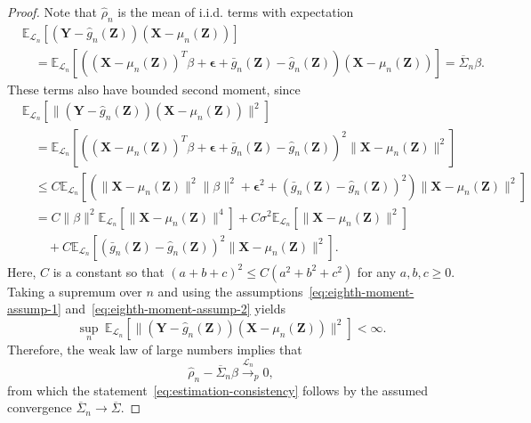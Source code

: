 \documentclass[12pt]{article}
\theoremstyle{definition}
\theoremstyle{remark}
\newcommand{\prx}{\bm X}
\newcommand{\prz}{\bm Z}
\newcommand{\pry}{{\bm Y}}
\newcommand{\peps}{\bm \epsilon}
\begin{document}
\begin{proof}

Note that $\widehat \rho_n$ is the mean of i.i.d. terms with expectation 
\begin{equation}
	\begin{split}
		&\mathbb E_{\mathcal L_n}[(\pry - \widehat g_n(\prz))(\prx - \mu_n(\prz))]  \\
		&\quad = \mathbb E_{\mathcal L_n}[((\prx - \mu_n(\prz))^T\beta + \peps + \bar g_n(\prz) - \widehat g_n(\prz))(\prx - \mu_n(\prz))] = \overline \Sigma_n \beta.
	\end{split}
\end{equation}
These terms also have bounded second moment, since
\begin{equation}
	\begin{split}
		&\mathbb E_{\mathcal L_n}[\|(\pry - \widehat g_n(\prz))(\prx - \mu_n(\prz))\|^2] \\
		&\quad= 	
		\mathbb E_{\mathcal L_n}[((\prx - \mu_n(\prz))^T\beta + \peps + \bar g_n(\prz) - \widehat g_n(\prz))^2\|\prx - \mu_n(\prz)\|^2] \\
		&\quad\leq
		C\mathbb E_{\mathcal L_n}[(\|\prx - \mu_n(\prz)\|^2\|\beta\|^2 + \peps^2 + (\bar g_n(\prz) - \widehat g_n(\prz))^2)\|\prx - \mu_n(\prz)\|^2] \\
		&\quad=
		C\|\beta\|^2\mathbb E_{\mathcal L_n}[\|\prx - \mu_n(\prz)\|^4] + C\sigma^2\mathbb E_{\mathcal L_n}[\|\prx - \mu_n(\prz)\|^2] \\
		&\quad \quad + C\mathbb E_{\mathcal L_n}[(\bar g_n(\prz) - \widehat g_n(\prz))^2\|\prx - \mu_n(\prz)\|^2].
	\end{split}
\end{equation}	
Here, $C$ is a constant so that $(a+b+c)^2 \leq C(a^2 + b^2 + c^2)$ for any $a, b, c \geq 0$.
Taking a supremum over $n$ and using the assumptions~\eqref{eq:eighth-moment-assump-1} and~\eqref{eq:eighth-moment-assump-2} yields
\begin{equation}
	\sup_n\ \mathbb E_{\mathcal L_n}[\|(\pry - \widehat g_n(\prz))(\prx - \mu_n(\prz))\|^2] < \infty.
\end{equation}
Therefore, the weak law of large numbers implies that
\begin{equation}
	\widehat \rho_n - \overline \Sigma_n \beta \overset{\mathcal L_n}\rightarrow _p  0,
\end{equation}
from which the statement~\eqref{eq:estimation-consistency} follows by the assumed convergence $\overline \Sigma_n \rightarrow \overline \Sigma$. 
	
\end{proof}
\end{document}
